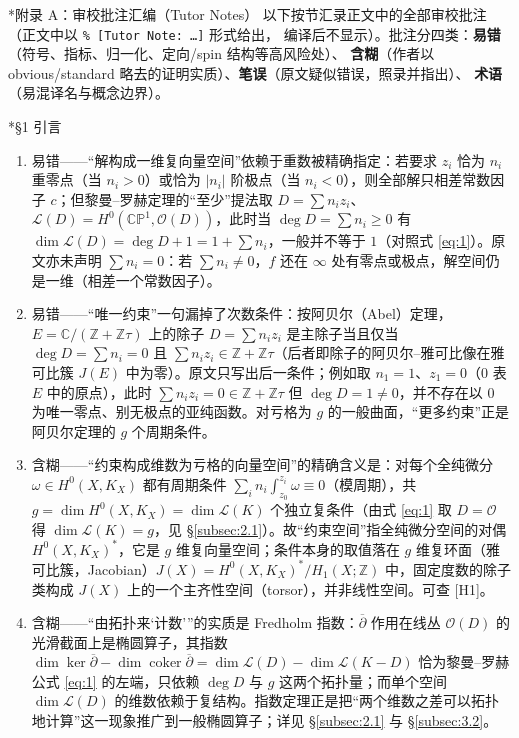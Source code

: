 \documentclass[11pt]{amsart}
\makeatletter
\def\section{\@startsection{section}{1}%
  \z@{4\linespacing\@plus\linespacing}{\linespacing}%
  {\bfseries\centering}}
\def\subsection{\@startsection{subsection}{2}%
   \z@{1.25\linespacing\@plus.7\linespacing}{.5\linespacing}%
   {\normalfont\bfseries}}
\theoremstyle{definition}
\theoremstyle{remark}
\theoremstyle{plain}
\numberwithin{equation}{section}
\renewcommand{\:}{\colon}
\newcommand{\CC}{{\mathbb C}}
\newcommand{\CP}{{\mathbb C\mathbb P}}
\newcommand{\ZZ}{{\mathbb Z}}
\DeclareMathOperator{\coker}{coker}
\newcommand{\dbar}{{\overline\partial}}
\newcommand{\sL}{\mathcal{L}}
\newcommand{\sO}{\mathcal{O}}
\newcommand{\sect}[1]{\sL(#1)}
\makeatother
\begin{document}
\clearpage
\section*{附录 A：审校批注汇编（Tutor Notes）}
\noindent 以下按节汇录正文中的全部审校批注（正文中以 \texttt{\% [Tutor Note: \dots]} 形式给出，
编译后不显示）。批注分四类：\textbf{易错}（符号、指标、归一化、定向/spin 结构等高风险处）、
\textbf{含糊}（作者以 obvious/standard 略去的证明实质）、\textbf{笔误}（原文疑似错误，照录并指出）、
\textbf{术语}（易混译名与概念边界）。

\subsection*{§1 引言}
\begin{enumerate}[leftmargin=2.2em,itemsep=2pt,topsep=2pt]
  \item 易错——“解构成一维复向量空间”依赖于重数被精确指定：若要求 $z_i$ 恰为 $n_i$ 重零点（当 $n_i>0$）或恰为 $|n_i|$ 阶极点（当 $n_i<0$），则全部解只相差常数因子 $c$；但黎曼–罗赫定理的“至少”提法取 $D=\sum n_iz_i$、$\sect D=H^0(\CP^1,\sO(D))$，此时当 $\deg D=\sum n_i\ge0$ 有 $\dim\sect D=\deg D+1=1+\sum n_i$，一般并不等于 $1$（对照式 \eqref{eq:1}）。原文亦未声明 $\sum n_i=0$：若 $\sum n_i\neq0$，$f$ 还在 $\infty$ 处有零点或极点，解空间仍是一维（相差一个常数因子）。
  \item 易错——“唯一约束”一句漏掉了次数条件：按阿贝尔（Abel）定理，$E=\CC/(\ZZ+\ZZ\tau )$ 上的除子 $D=\sum n_iz_i$ 是主除子当且仅当 $\deg D=\sum n_i=0$ 且 $\sum n_iz_i\in \ZZ+\ZZ\tau $（后者即除子的阿贝尔–雅可比像在雅可比簇 $J(E)$ 中为零）。原文只写出后一条件；例如取 $n_1=1$、$z_1=0$（$0$ 表 $E$ 中的原点），此时 $\sum n_iz_i=0\in \ZZ+\ZZ\tau $ 但 $\deg D=1\neq0$，并不存在以 $0$ 为唯一零点、别无极点的亚纯函数。对亏格为 $g$ 的一般曲面，“更多约束”正是阿贝尔定理的 $g$ 个周期条件。
  \item 含糊——“约束构成维数为亏格的向量空间”的精确含义是：对每个全纯微分 $\omega\in H^0(X,K_X)$ 都有周期条件 $\sum_i n_i\int_{z_0}^{z_i}\omega\equiv0$（模周期），共 $g=\dim H^0(X,K_X)=\dim\sect K$ 个独立复条件（由式 \eqref{eq:1} 取 $D=\sO$ 得 $\dim\sect K=g$，见 \S\ref{subsec:2.1}）。故“约束空间”指全纯微分空间的对偶 $H^0(X,K_X)^*$，它是 $g$ 维复向量空间；条件本身的取值落在 $g$ 维复环面（雅可比簇，Jacobian）$J(X)=H^0(X,K_X)^*/H_1(X;\ZZ)$ 中，固定度数的除子类构成 $J(X)$ 上的一个主齐性空间（torsor），并非线性空间。可查 [H1]。
  \item 含糊——“由拓扑来‘计数’”的实质是 Fredholm 指数：$\dbar$ 作用在线丛 $\sO(D)$ 的光滑截面上是椭圆算子，其指数 $\dim\ker\dbar-\dim\coker\dbar=\dim\sect D-\dim\sect{K-D}$ 恰为黎曼–罗赫公式 \eqref{eq:1} 的左端，只依赖 $\deg D$ 与 $g$ 这两个拓扑量；而单个空间 $\dim\sect D$ 的维数依赖于复结构。指数定理正是把“两个维数之差可以拓扑地计算”这一现象推广到一般椭圆算子；详见 \S\ref{subsec:2.1} 与 \S\ref{subsec:3.2}。

\end{enumerate}
\end{document}
